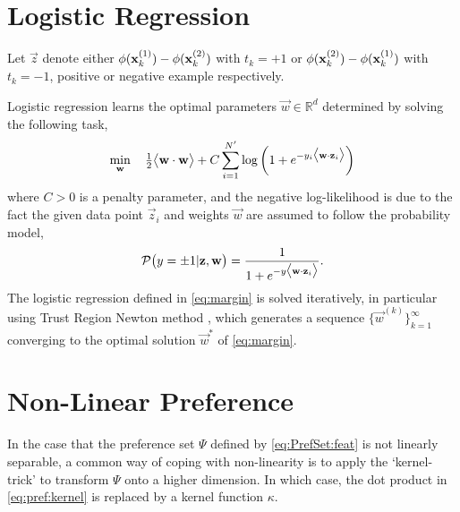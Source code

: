 \section{Logistic Regression}
Let $\vec{z}$ denote either ${\mathbf{\phi}}(\mathbf{x}_k^{(1)})-{\mathbf{\phi}}(\mathbf{x}_k^{(2)})$ 
with \mbox{$t_k=+1$} or 
${\mathbf{\phi}}(\mathbf{x}_k^{(2)})-{\mathbf{\phi}}(\mathbf{x}_k^{(1)})$ with \mbox{$t_k=-1$}, positive 
or negative example respectively.

Logistic regression learns the optimal parameters $\vec{w}\in\mathbb{R}^d$ 
determined by solving the following task,
\begin{equation}\label{eq:margin}
\min_{\vec{w}}\quad \tfrac{1}{2}\inner{\vec{w}}{\vec{w}} + C \sum_{i=1}^{N'} 
\log\left(1 + e^{-y_i \inner{\vec{w}}{\vec{z}_i}}\right) 
\end{equation}
where $C > 0$ is a penalty parameter, and the negative log-likelihood is due to 
the fact the given data point $\vec{z}_i$ and weights $\vec{w}$ are assumed to 
follow the probability model,
\begin{equation}\label{eq:prob}
\mathcal{P}\big(y=\pm1|\vec{z},\vec{w}\big)=\frac{1}{1+e^{-y\inner{\vec{w}}{\vec{z}_i}}}.
\end{equation}
The logistic regression defined in \cref{eq:margin} is solved iteratively, in 
particular using Trust Region Newton method 
\citep[cf.][]{Lin08:newtontrustregion}, which generates a sequence 
$\{\vec{w}^{(k)}\}_{k=1}^\infty$ converging to the optimal solution $\vec{w}^*$ 
of \cref{eq:margin}.


\section{Non-Linear Preference}\label{sec:ord:nonlinpref}
In the case that the preference set $\Psi$ defined by \cref{eq:PrefSet:feat} is 
not linearly separable, a common way of coping with non-linearity is to apply 
the `kernel-trick' to transform $\Psi$ onto a higher dimension. In which case, 
the dot product in \cref{eq:pref:kernel} is replaced by a kernel function 
$\kappa$.

